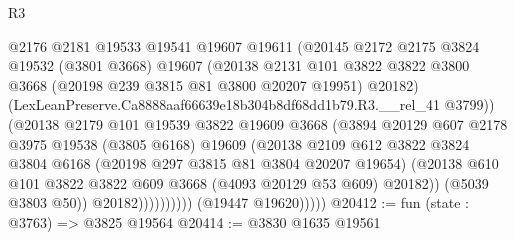 \begin{lexlean}{R3}
\begin{coremodule}
                              @2176
                              @2181
                              @19533
                              @19541
                              @19607
                              @19611
                              (@20145
                                @2172
                                @2175
                                @3824
                                @19532
                                (@3801 @3668)
                                @19607
                                (@20138
                                  @2131
                                  @101
                                  @3822
                                  @3822
                                  @3800
                                  @3668
                                  (@20198 @239 @3815 @81 @3800 @20207 @19951)
                                  @20182)
                                (LexLeanPreserve.Ca8888aaf66639e18b304b8df68dd1b79.R3.__rel_41
                                  @3799))
                              (@20138
                                @2179
                                @101
                                @19539
                                @3822
                                @19609
                                @3668
                                (@3894
                                  @20129
                                  @607
                                  @2178
                                  @3975
                                  @19538
                                  (@3805 @6168)
                                  @19609
                                  (@20138
                                    @2109
                                    @612
                                    @3822
                                    @3824
                                    @3804
                                    @6168
                                    (@20198 @297 @3815 @81 @3804 @20207 @19654)
                                    (@20138
                                      @610
                                      @101
                                      @3822
                                      @3822
                                      @609
                                      @3668
                                      (@4093 @20129 @53 @609)
                                      @20182))
                                  (@5039 @3803 @50))
                                @20182))))))))))
            (@19447 @19620)))))
@20412 := fun (state : @3763) => @3825 @19564
@20414 := @3830 @1635 @19561

\end{coremodule}
\end{lexlean}

